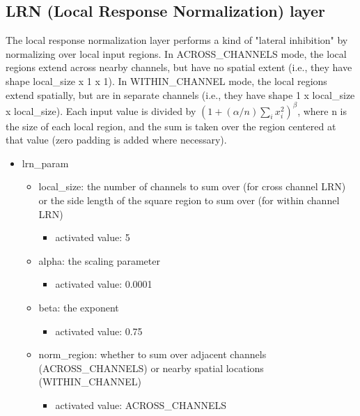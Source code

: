 \documentclass[11pt]{article}
\begin{document}
\subsection{LRN (Local Response Normalization) layer}
The local response normalization layer performs a kind of "lateral inhibition" by normalizing over local input regions. In ACROSS\_CHANNELS mode, the local regions extend across nearby channels, but have no spatial extent (i.e., they have shape local\_size x 1 x 1). In WITHIN\_CHANNEL mode, the local regions extend spatially, but are in separate channels (i.e., they have shape 1 x local\_size x local\_size). Each input value is divided by $(1 + (\alpha/n) \sum\nolimits_{i}x^2_{i})^\beta$, where n is the size of each local region, and the sum is taken over the region centered at that value (zero padding is added where necessary).
\begin{itemize}
	\item lrn\_param
	\begin{itemize}
		\item local\_size:  the number of channels to sum over (for cross channel LRN) or the side length of the square region to sum over (for within channel LRN)
		\begin{itemize}
			\item activated value: 5
		\end{itemize}
		\item alpha: the scaling parameter
		\begin{itemize}
			\item activated value: 0.0001
		\end{itemize}
		\item beta: the exponent
		\begin{itemize}
			\item activated value: 0.75
		\end{itemize}
		\item norm\_region: whether to sum over adjacent channels (ACROSS\_CHANNELS) or nearby spatial locations (WITHIN\_CHANNEL)
		\begin{itemize}
			\item activated value: ACROSS\_CHANNELS
		\end{itemize}
	\end{itemize}
\end{itemize}
\end{document}

